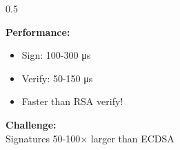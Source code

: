 \documentclass[aspectratio=169,10pt]{beamer}
\newcommand{\teaching}[1]{}
\theoremstyle{plain}
\begin{document}
\begin{frame}
\begin{columns}[T]
\begin{column}{0.5\textwidth}
    \vspace{0.5cm}
    
    \textbf{Performance:}
    \begin{itemize}
      \item Sign: 100-300 μs
      \item Verify: 50-150 μs
      \item Faster than RSA verify!
    \end{itemize}
    
    \vspace{0.3cm}
    
    \begin{redBox}
      \textbf{Challenge:}\\
      Signatures 50-100× larger than ECDSA
    \end{redBox}
  
    \end{column}
  \end{columns}
  
  \teaching{Introduce primary signature standard}
\end{frame}
\end{document}

